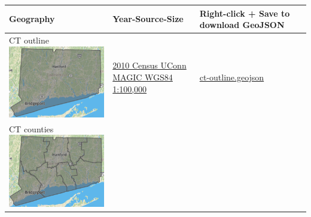\documentclass[
  english,
]{book}
\begin{document}
\begin{longtable}[]{@{}llll@{}}
\toprule
\begin{minipage}[b]{0.28\columnwidth}\raggedright
Geography\strut
\end{minipage} & \begin{minipage}[b]{0.22\columnwidth}\raggedright
Year-Source-Size\strut
\end{minipage} & \begin{minipage}[b]{0.19\columnwidth}\raggedright
Right-click + Save to download GeoJSON\strut
\end{minipage} & \begin{minipage}[b]{0.19\columnwidth}\raggedright
\strut
\end{minipage}\tabularnewline
\midrule
\endhead
\begin{minipage}[t]{0.28\columnwidth}\raggedright
CT outline \includegraphics{data/ct-outline.png}\strut
\end{minipage} & \begin{minipage}[t]{0.22\columnwidth}\raggedright
\href{http://magic.lib.uconn.edu/connecticut_data.html\#boundaries}{2010 Census UConn MAGIC WGS84 1:100,000}\strut
\end{minipage} & \begin{minipage}[t]{0.19\columnwidth}\raggedright
\href{data/ct-outline.geojson}{ct-outline.geojson}\strut
\end{minipage} & \begin{minipage}[t]{0.19\columnwidth}\raggedright
\strut
\end{minipage}\tabularnewline
\begin{minipage}[t]{0.28\columnwidth}\raggedright
CT counties \includegraphics{data/ct-counties.png}\strut

\end{minipage}
\end{longtable}
\end{document}
